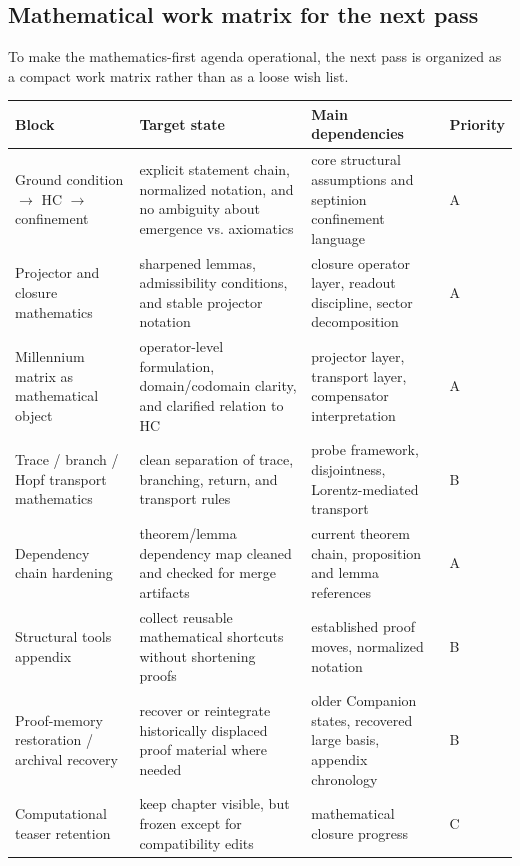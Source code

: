 \documentclass[12pt,a4paper]{article}
\begin{document}
\subsection*{Mathematical work matrix for the next pass}
To make the mathematics-first agenda operational, the next pass is organized as a compact work matrix rather than as a loose wish list.
\begin{center}
{\tiny\setlength{\tabcolsep}{1.5pt}\begin{tabular}{@{}p{}P{0.23\textwidth}P{0.25\textwidth}P{0.08\textwidth}@{}}
\toprule
\textbf{Block} & \textbf{Target state} & \textbf{Main dependencies} & \textbf{Priority}\\
\midrule
Ground condition $\to$ HC $\to$ confinement & explicit statement chain, normalized notation, and no ambiguity about emergence vs. axiomatics & core structural assumptions and septinion confinement language & A\\
Projector and closure mathematics & sharpened lemmas, admissibility conditions, and stable projector notation & closure operator layer, readout discipline, sector decomposition & A\\
Millennium matrix as mathematical object & operator-level formulation, domain/codomain clarity, and clarified relation to HC & projector layer, transport layer, compensator interpretation & A\\
Trace / branch / Hopf transport mathematics & clean separation of trace, branching, return, and transport rules & probe framework, disjointness, Lorentz-mediated transport & B\\
Dependency chain hardening & theorem/lemma dependency map cleaned and checked for merge artifacts & current theorem chain, proposition and lemma references & A\\
Structural tools appendix & collect reusable mathematical shortcuts without shortening proofs & established proof moves, normalized notation & B\\
Proof-memory restoration / archival recovery & recover or reintegrate historically displaced proof material where needed & older Companion states, recovered large basis, appendix chronology & B\\
Computational teaser retention & keep chapter visible, but frozen except for compatibility edits & mathematical closure progress & C\\
\bottomrule
\end{tabular}}
\end{center}
\end{document}
